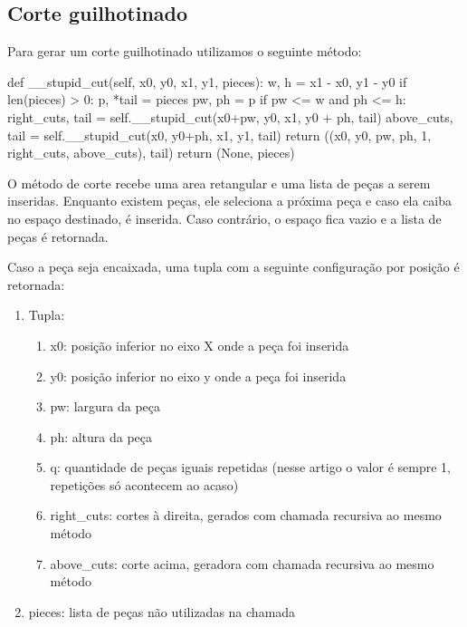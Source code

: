 \documentclass[12pt]{article}
\begin{document}
\subsection{Corte guilhotinado}
\label{sub:corte_guilhotinado}

Para gerar um corte guilhotinado utilizamos o seguinte método:

\begin{python}
    def __stupid_cut(self, x0, y0, x1, y1, pieces):
        w, h = x1 - x0, y1 - y0
        if len(pieces) > 0:
            p, *tail = pieces
            pw, ph = p
            if pw <= w and ph <= h:
                right_cuts, tail = self.__stupid_cut(x0+pw, y0, x1, y0 + ph, tail)
                above_cuts, tail = self.__stupid_cut(x0, y0+ph, x1, y1, tail)
                return ((x0, y0, pw, ph, 1, right_cuts, above_cuts), tail)
        return (None, pieces)
\end{python}

O método de corte recebe uma area retangular e uma lista de peças a serem
inseridas. Enquanto existem peças, ele seleciona a próxima peça e caso ela
caiba no espaço destinado, é inserida. Caso contrário, o espaço fica vazio e a
lista de peças é retornada.

Caso a peça seja encaixada, uma tupla com a seguinte configuração por posição é retornada:

\begin{enumerate}
    \item Tupla:
        \begin{enumerate}
            \item x0: posição inferior no eixo X onde a peça foi inserida
            \item y0: posição inferior no eixo y onde a peça foi inserida
            \item pw: largura da peça
            \item ph: altura da peça
            \item q: quantidade de peças iguais repetidas (nesse artigo o valor é sempre 1, repetições só acontecem ao acaso)
            \item right\_cuts: cortes à direita, gerados com chamada recursiva ao mesmo método
            \item above\_cuts: corte acima, geradora com chamada recursiva ao mesmo método
        \end{enumerate}
    \item pieces: lista de peças não utilizadas na chamada
\end{enumerate}
\end{document}
